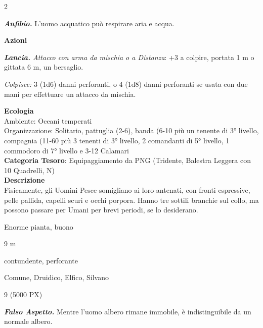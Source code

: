 \begin{multicols}{2}
{\emph{\textbf{Anfibio.}} L'uomo acquatico può respirare aria e acqua.

\textbf{Azioni}

\emph{\textbf{Lancia.} Attacco con arma da mischia o a Distanza}: +3 a colpire, portata 1 m o gittata 6 m, un bersaglio.

\emph{Colpisce:} 3 (1d6) danni perforanti, o 4 (1d8) danni perforanti se usata con due mani per effettuare un attacco da mischia.

\textbf{Ecologia}\\
Ambiente: Oceani temperati\\
Organizzazione: Solitario, pattuglia (2-6), banda (6-10 più un tenente di 3° livello, compagnia (11-60 più 3 tenenti di 3° livello, 2 comandanti di 5° livello, 1 commodoro di 7° livello e 3-12 Calamari\\
\textbf{Categoria Tesoro}: Equipaggiamento da PNG (Tridente, Balestra Leggera con 10 Quadrelli, N)\\
\textbf{Descrizione}\\
Fisicamente, gli Uomini Pesce somigliano ai loro antenati, con fronti espressive, pelle pallida, capelli scuri e occhi porpora. Hanno tre sottili branchie sul collo, ma possono passare per Umani per brevi periodi, se lo desiderano.

\begin{description}[noitemsep, topsep=0pt, parsep=0pt, partopsep=0pt, itemsep=1pt, leftmargin=2.35cm,  labelwidth=2.2cm, itemindent=0cm, listparindent=0pt] %
\setlength{\baselineskip}{10pt}
\item[\textbf{Taglia/Tipo}] Enorme pianta, buono
\item[\textbf{Caratt.}] 
\item[\textbf{Punti Ferita}] 
\item[\textbf{Movimento}] 9 m
\item[\textbf{Tiri Salvez.}] 
\item[\textbf{Res. Danni}] contundente, perforante
\item[\textbf{Linguaggi}] Comune, Druidico, Elfico, Silvano
\item[\textbf{Sfida}] 9 (5000 PX)
\end{description}
\smallskip

\emph{\textbf{Falso Aspetto.}} Mentre l'uomo albero rimane immobile, è indistinguibile da un normale albero.

}
\end{multicols}
